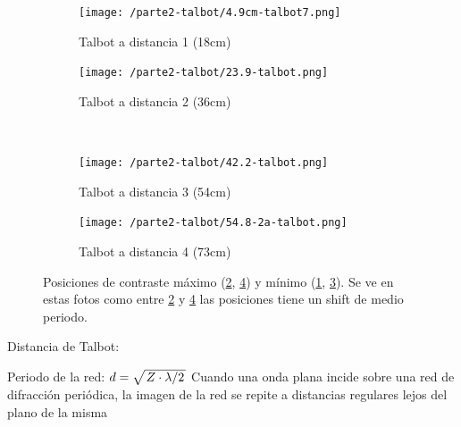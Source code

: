 \documentclass{./packages/optica-article}
\begin{document}
\begin{figure}[hptb]
\begin{center}
    \begin{subfigure}[t]{0.45\textwidth}\centering
        \texttt{[image: /parte2-talbot/4.9cm-talbot7.png]}
        \caption{ Talbot a distancia 1 (18cm)}
        \label{fig:talbot1}	
    \end{subfigure}
	\quad
	\begin{subfigure}[t]{0.45\textwidth}\centering
		\texttt{[image: /parte2-talbot/23.9-talbot.png]}
        \caption{Talbot a distancia 2 (36cm)}
        \label{fig:talbot2}
	\end{subfigure}
	\\
	\begin{subfigure}[t]{0.45\textwidth}\centering
		\texttt{[image: /parte2-talbot/42.2-talbot.png]}
        \caption{ Talbot a distancia 3 (54cm)}
        \label{fig:talbot3}
	\end{subfigure}
	\quad
	\begin{subfigure}[t]{0.45\textwidth}\centering
		\texttt{[image: /parte2-talbot/54.8-2a-talbot.png]}
        \caption{ Talbot a distancia 4 (73cm)}
        \label{fig:talbot4}
	\end{subfigure}
	
\caption{Posiciones de contraste máximo (\ref{fig:talbot2}, \ref{fig:talbot4}) y mínimo (\ref{fig:talbot1}, \ref{fig:talbot3}).
Se ve en estas fotos como entre \ref{fig:talbot2} y \ref{fig:talbot4} las posiciones tiene un shift de medio periodo.
	}\label{fig:alltalbot}
\end{center}
\end{figure}

Distancia de Talbot: 

Periodo de la red:
$d=\sqrt{\flatfrac{Z \cdot \lambda}{2}}$
Cuando una onda plana incide sobre una red de difracción periódica, la imagen de la red se repite a distancias regulares lejos del plano de la misma
\end{document}
